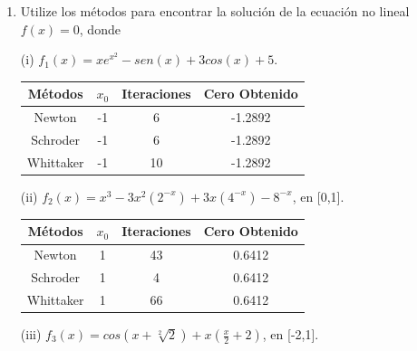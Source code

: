 \documentclass{udparticle}
\begin{document}
\begin{enumerate}
\begin{itemize}
\end{itemize}
	\begin{enumerate}
	
		\item Utilize los métodos para encontrar la solución de la ecuación no lineal $f(x)=0$, donde
		
		(i) $f_{1}(x)=xe^{x^2}-sen(x)+3cos(x)+5$.
		
		\begin{table}[H]
			\centering
			\begin{tabular}{|c|c|c|c|}
				\hline
				Métodos & $x_{0}$ & Iteraciones & Cero Obtenido \\
				\hline
				Newton & -1 & 6 & -1.2892 \\
				\hline
				Schroder & -1 & 6 & -1.2892 \\
				\hline
				Whittaker & -1 & 10 & -1.2892 \\
				\hline				
			\end{tabular}
			\end{table}	
		
		
		
		(ii) $f_{2}(x)=x^3-3x^2(2^{-x})+3x(4^{-x})-8^{-x}$, en [0,1].
		
			\begin{table}[H]
			\centering
			\begin{tabular}{|c|c|c|c|}
				\hline
				Métodos & $x_{0}$ & Iteraciones & Cero Obtenido \\
				\hline
				Newton & 1 & 43 & 0.6412 \\
				\hline
				Schroder & 1 & 4 & 0.6412\\
				\hline
				Whittaker & 1 & 66 & 0.6412\\
				\hline				
			\end{tabular}
			\end{table}	
			
		(iii) $f_{3}(x)=cos(x+\sqrt[2]{2})+x(\frac{x}{2}+2)$, en [-2,1].	
		

\end{enumerate}
\end{enumerate}
\end{document}
